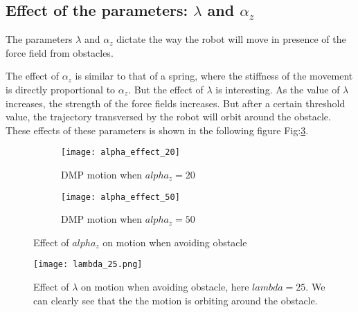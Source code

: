 \subsection{Effect of the parameters: $\lambda$ and $\alpha_z$}
The parameters $\lambda$ and $\alpha_z$ dictate the way the robot will move in presence of the force field from obstacles.

The effect of $\alpha_z$ is similar to that of a spring, where the stiffness of the movement is directly proportional to $\alpha_z$.
But the effect of $\lambda$ is interesting. As the value of $\lambda$ increases, the strength of the force fields increases. But after a certain 
threshold value, the trajectory transversed by the robot will orbit around the obstacle. These effects of these parameters is
shown in the following figure Fig:\ref{fig:paramEffect}.

\begin{figure}[!htp]
    \centering
    \begin{subfigure}{0.5\textwidth}
        \texttt{[image: alpha\_effect\_20]}
        \caption{DMP motion when $alpha_z = 20$}
        \label{fig:alpha_effect_20}
    \end{subfigure}%
    \begin{subfigure}{0.5\textwidth}
        \centering
        \texttt{[image: alpha\_effect\_50]}
        \caption{DMP motion when $alpha_z = 50$}
        \label{fig:alpha_effect_50}
    \end{subfigure}
    \caption{Effect of $alpha_z$ on motion when avoiding obstacle}
    \label{fig:paramEffect}
\end{figure}

\begin{figure}[!htp]
    \centering
    \texttt{[image: lambda\_25.png]}
    \caption{Effect of $\lambda$ on motion when avoiding obstacle, here $lambda = 25$. We can clearly see that the the motion is orbiting
    around the obstacle.}
\end{figure}




